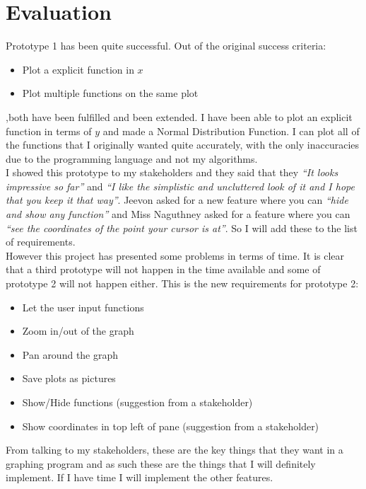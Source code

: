 \documentclass[../../../main.tex]{subfiles}
\begin{document}
\chapter{Evaluation}
Prototype 1 has been quite successful. Out of the original success criteria:
\begin{itemize}
	\item Plot a explicit function in $x$
	\item Plot multiple functions on the same plot
\end{itemize}
,both have been fulfilled and been extended. I have been able to plot an explicit function in terms of $y$ and made a Normal Distribution Function. I can plot all of the functions that I originally wanted quite accurately, with the only inaccuracies due to the programming language and not my algorithms.\\
I showed this prototype to my stakeholders and they said that they \textit{``It looks impressive so far''} and \textit{``I like the simplistic and uncluttered look of it and I hope that you keep it that way''}. Jeevon asked for a new feature where you can \textit{``hide and show any function''} and Miss Naguthney asked for a feature where you can \textit{``see the coordinates of the point your cursor is at''}. So I will add these to the list of requirements.
\\
However this project has presented some problems in terms of time. It is clear that a third prototype will not happen in the time available and some of prototype 2 will not happen either. This is the new requirements for prototype 2:
\begin{itemize}
	\item Let the user input functions
	\item Zoom in/out of the graph
	\item Pan around the graph
	\item Save plots as pictures
	\item Show/Hide functions (suggestion from a stakeholder)
	\item Show coordinates in top left of pane (suggestion from a stakeholder)
\end{itemize}
From talking to my stakeholders, these are the key things that they want in a graphing program and as such these are the things that I will definitely implement. If I have time I will implement the other features.
\newpage
\end{document}
